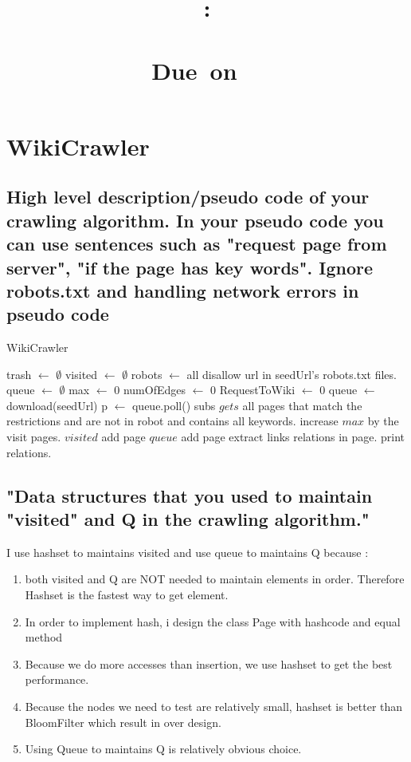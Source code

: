 \documentclass{article}
\title{
    \vspace{2in}
    \textmd{\textbf{\hmwkClass:\\\ \hmwkTitle}}\\
    \normalsize\vspace{0.1in}\small{Due\ on\ \hmwkDueDate\ }\\
    \vspace{0.1in}\large{\textit{\hmwkClassInstructor}}
    \vspace{3in}
}
\author{\textbf{\hmwkAuthorName}}
\date{}
\begin{document}
\maketitle
\newpage
\tableofcontents
\newpage


\section{WikiCrawler}
\subsection{High level description/pseudo code of your crawling algorithm. In your pseudo code you can use sentences such as "request page from server", "if the page has key words".  Ignore robots.txt and handling network errors in pseudo code}

\begin{algorithm}
\caption{WikiCrawler}
\begin{algorithmic}[1]
\State trash $\gets$ $\emptyset$
\State visited $\gets$ $\emptyset$
\State robots $\gets$ all disallow url in seedUrl's robots.txt files.
\State queue $\gets$ $\emptyset$
\State max $\gets$ 0
\State numOfEdges $\gets$ 0
\State RequestToWiki $\gets$ 0
\State queue $\gets$ download(seedUrl)
\State p $\gets$ queue.poll()
\State subs $gets$ all pages that match the restrictions and are not in robot and contains all keywords. increase $max$ by the visit pages.
\State $visited$  add page
\State $queue$ add page
\EndIf
\EndFor
\EndWhile
{}
\State extract links relations in page.
\State print relations.
\EndFor
\EndProcedure
\end{algorithmic}
\end{algorithm}
\newpage

\subsection{"Data structures that you used to maintain "visited" and Q in the crawling algorithm."}
I use hashset to maintains visited and use queue to maintains Q because :

\begin{enumerate}
  \item both visited and Q are NOT needed to maintain elements in order. Therefore Hashset is the fastest way to get element.
  \item In order to implement hash, i design the class Page with hashcode and equal method
  \item Because we do more accesses than insertion, we use hashset to get the best performance.
  \item Because the nodes we need to test are relatively small, hashset is better than BloomFilter which result in over design.
  \item Using Queue to maintains Q is relatively obvious choice.
\end{enumerate}
\end{document}
